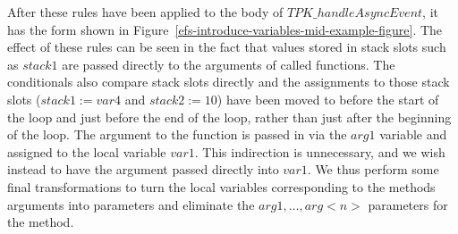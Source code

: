 After these rules have been applied to the body of
$TPK\_handleAsyncEvent$, it has the form shown in
Figure~\ref{efs-introduce-variables-mid-example-figure}.
The effect of these rules can be seen in the fact that values stored
in stack slots such as $stack1$ are passed directly to the arguments
of called functions.
The conditionals also compare stack slots directly and the assignments
to those stack slots ($stack1 := var4$ and $stack2 := 10$) have been
moved to before the start of the loop and just before the end of the
loop, rather than just after the beginning of the loop.
The argument to the function is passed in via the $arg1$ variable and
assigned to the local variable $var1$. 
This indirection is unnecessary, and we wish instead to have the
argument passed directly into $var1$.
We thus perform some final transformations to turn the local variables
corresponding to the methods arguments into parameters and eliminate
the $arg1, \ldots, arg{<}n{>}$ parameters for the method.

